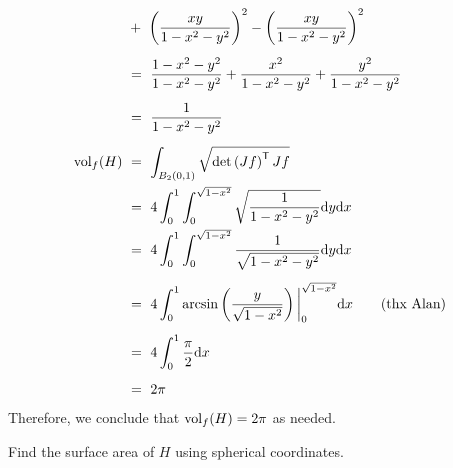 \begin{pf}
\begin{align*}
        & \ + \ \left( \frac{xy}{1-x^{2}-y^{2}} \right)^{2} -
        \left( \frac{xy}{1-x^{2}-y^{2}} \right)^{2} \vsp
        & \ = \
        \frac{1-x^{2}-y^{2}}{1-x^{2}-y^{2}} +
        \frac{x^{2}}{1-x^{2}-y^{2}} + \frac{y^{2}}{1-x^{2}-y^{2}} \vsp
        & \ = \ \frac{1}{1-x^{2}-y^{2}} \vsp
        \trm{vol}_{f}(H) & \ = \ \int_{B_{2}(0,1)}
        \sqrt{\det \left( Jf \right)^{\msf{T}}Jf} \\
                         & \ = \ 4\int_{0}^{1}\int_{0}^{\sqrt{1-x^{2}}}
                         \sqrt{\frac{1}{1-x^{2}-y^{2}}}\d y\d x \\
                         & \ = \ 4\int_{0}^{1}\int_{0}^{\sqrt{1-x^{2}}}
                         \frac{1}{\sqrt{1-x^{2}-y^{2}}}\d y\d x \vsp
                         & \ = \ 4\int_{0}^{1}\arcsin \left(
                             \frac{y}{\sqrt{1-x^{2}}}
                         \right)\bigg\rvert_{0}^{\sqrt{1-x^{2}}}\d x
                         \tag*{(thx Alan)}\vsp
                         & \ = \ 4\int_{0}^{1} \frac{\pi}{2}\d x \vsp
                         & \ = \ 2\pi
    \end{align*}
    Therefore, we conclude that $ \textrm{vol}_{f}(H) = 2\pi $ as needed.
\end{pf}

\begin{exr}[num=14.10b]
    Find the surface area of $H$ using spherical coordinates.
\end{exr}

